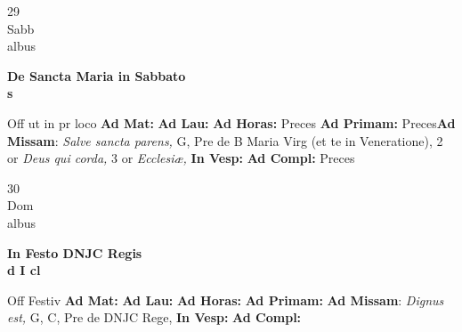 \documentclass[10pt, openany]{book}
\begin{document}
        \begin{center}
            \begin{minipage}{3.5in}
                \vspace{2em}
                \begin{minipage}{0.5in}
                    {\Huge 29} \\
                    {\normalsize Sabb} \\
                    {\normalsize albus}
                \end{minipage}
                \begin{minipage}{3.0in}
                    \textbf{ \large De Sancta Maria in Sabbato \\
                    \textnormal{\normalsize s}} \\ 
                \end{minipage}
                \begin{justify}Off ut in pr loco
                    \textbf{Ad Mat: }
                    \textbf{Ad Lau: }
                    \textbf{Ad Horas: }Preces
                    \textbf{Ad Primam: }Preces\textbf{Ad Missam}: \textit{Salve sancta parens,} G, Pre de B Maria Virg (et te in Veneratione), 2 or \textit{Deus qui corda,} 3 or \textit{Ecclesiæ,}  
                    \textbf{In Vesp: }
                    \textbf{Ad Compl: }Preces
                \end{justify}
            \end{minipage}
        \end{center}
    
        \begin{center}
            \begin{minipage}{3.5in}
                \vspace{2em}
                \begin{minipage}{0.5in}
                    {\Huge 30} \\
                    {\normalsize Dom} \\
                    {\normalsize albus}
                \end{minipage}
                \begin{minipage}{3.0in}
                    \textbf{ \large In Festo DNJC Regis \\
                    \textnormal{\normalsize d I cl}} \\ 
                \end{minipage}
                \begin{justify}Off Festiv
                    \textbf{Ad Mat: }
                    \textbf{Ad Lau: }
                    \textbf{Ad Horas: }
                    \textbf{Ad Primam: }\textbf{Ad Missam}: \textit{Dignus est,} G, C, Pre de DNJC Rege,  
                    \textbf{In Vesp: }
                    \textbf{Ad Compl: }
                \end{justify}
            \end{minipage}
        \end{center}
    
\end{document}
